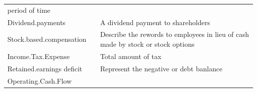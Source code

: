 \documentclass[11pt,]{article}
\begin{document}
\begin{longtable}[]{@{}lll@{}}
\begin{minipage}[t]{0.62\columnwidth}
period of time\strut
\end{minipage}\tabularnewline
\begin{minipage}[t]{0.19\columnwidth}\raggedright
Dividend.payments\strut
\end{minipage} & \begin{minipage}[t]{0.10\columnwidth}\raggedright
\strut
\end{minipage} & \begin{minipage}[t]{0.62\columnwidth}\raggedright
A dividend payment to shareholders\strut
\end{minipage}\tabularnewline
\begin{minipage}[t]{0.19\columnwidth}\raggedright
Stock.based.compensation\strut
\end{minipage} & \begin{minipage}[t]{0.10\columnwidth}\raggedright
\strut
\end{minipage} & \begin{minipage}[t]{0.62\columnwidth}\raggedright
Describe the rewords to employees in lieu of cash made by stock or stock
options\strut
\end{minipage}\tabularnewline
\begin{minipage}[t]{0.19\columnwidth}\raggedright
Income.Tax.Expense\strut
\end{minipage} & \begin{minipage}[t]{0.10\columnwidth}\raggedright
\strut
\end{minipage} & \begin{minipage}[t]{0.62\columnwidth}\raggedright
Total amount of tax\strut
\end{minipage}\tabularnewline
\begin{minipage}[t]{0.19\columnwidth}\raggedright
Retained.earnings deficit\strut
\end{minipage} & \begin{minipage}[t]{0.10\columnwidth}\raggedright
\strut
\end{minipage} & \begin{minipage}[t]{0.62\columnwidth}\raggedright
Represent the negative or debt banlance\strut
\end{minipage}\tabularnewline
\begin{minipage}[t]{0.19\columnwidth}\raggedright
Operating.Cash.Flow\strut
\end{minipage} & \begin{minipage}[t]{0.10\columnwidth}\raggedright
\strut
\end{minipage} & \begin{minipage}[t]{0.62\columnwidth}\raggedright

\end{minipage}
\end{longtable}
\end{document}
